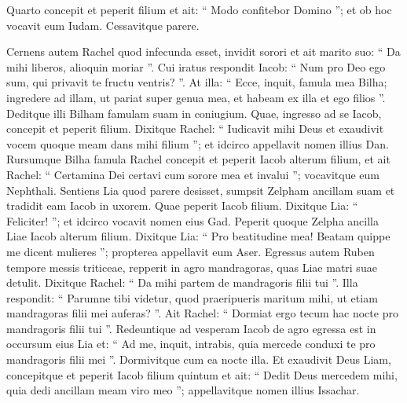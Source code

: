 \begin{biblechapter}
\begin{biblechapter}
\begin{biblechapter}
\begin{biblechapter}
\begin{biblechapter}
\begin{biblechapter}
\begin{biblechapter}
\begin{biblechapter}
\begin{biblechapter}
\begin{biblechapter}
\begin{biblechapter}
\begin{biblechapter}
\begin{biblechapter}
\begin{biblechapter}
\begin{biblechapter}
\begin{biblechapter}
\begin{biblechapter}
\begin{biblechapter}
\begin{biblechapter}
\begin{biblechapter}
\begin{biblechapter}
\begin{biblechapter}
\begin{biblechapter}
\begin{biblechapter}
\begin{biblechapter}
\begin{biblechapter}
\begin{biblechapter}
\begin{biblechapter}
\begin{biblechapter}
 \verse Quarto concepit et peperit filium et ait: “ Modo confitebor Domino ”; et ob hoc vocavit eum Iudam. Cessavitque parere.
 
\begin{biblechapter}
\verse Cernens autem Rachel quod infecunda esset, invidit sorori et ait marito suo: “ Da mihi liberos, alioquin moriar ”. 
\verse Cui iratus respondit Iacob: “ Num pro Deo ego sum, qui privavit te fructu ventris? ”. 
\verse At illa: “ Ecce, inquit, famula mea Bilha; ingredere ad illam, ut pariat super genua mea, et habeam ex illa et ego filios ”. 
\verse Deditque illi Bilham famulam suam in coniugium. Quae, 
\verse ingresso ad se Iacob, concepit et peperit filium. 
\verse Dixitque Rachel: “ Iudicavit mihi Deus et exaudivit vocem quoque meam dans mihi filium ”; et idcirco appellavit nomen illius Dan.
 \verse Rursumque Bilha famula Rachel concepit et peperit Iacob alterum filium, et 
 \verse ait Rachel: “ Certamina Dei certavi cum sorore mea et invalui ”; vocavitque eum Nephthali.
 \verse Sentiens Lia quod parere desisset, sumpsit Zelpham ancillam suam et tradidit eam Iacob in uxorem. 
\verse Quae peperit Iacob filium. 
\verse Dixitque Lia: “ Feliciter! ”; et idcirco vocavit nomen eius Gad.
 \verse Peperit quoque Zelpha ancilla Liae Iacob alterum filium. 
\verse Dixitque Lia: “ Pro beatitudine mea! Beatam quippe me dicent mulieres ”; propterea appellavit eum Aser.
 \verse Egressus autem Ruben tempore messis triticeae, repperit in agro mandragoras, quas Liae matri suae detulit. Dixitque Rachel: “ Da mihi partem de mandragoris filii tui ”. 
\verse Illa respondit: “ Parumne tibi videtur, quod praeripueris maritum mihi, ut etiam mandragoras filii mei auferas? ”. Ait Rachel: “ Dormiat ergo tecum hac nocte pro mandragoris filii tui ”. 
\verse Redeuntique ad vesperam Iacob de agro egressa est in occursum eius Lia et: “ Ad me, inquit, intrabis, quia mercede conduxi te pro mandragoris filii mei ”. Dormivitque cum ea nocte illa. 
\verse Et exaudivit Deus Liam, concepitque et peperit Iacob filium quintum 
 \verse et ait: “ Dedit Deus mercedem mihi, quia dedi ancillam meam viro meo ”; appellavitque nomen illius Issachar.

\end{biblechapter}
\end{biblechapter}
\end{biblechapter}
\end{biblechapter}
\end{biblechapter}
\end{biblechapter}
\end{biblechapter}
\end{biblechapter}
\end{biblechapter}
\end{biblechapter}
\end{biblechapter}
\end{biblechapter}
\end{biblechapter}
\end{biblechapter}
\end{biblechapter}
\end{biblechapter}
\end{biblechapter}
\end{biblechapter}
\end{biblechapter}
\end{biblechapter}
\end{biblechapter}
\end{biblechapter}
\end{biblechapter}
\end{biblechapter}
\end{biblechapter}
\end{biblechapter}
\end{biblechapter}
\end{biblechapter}
\end{biblechapter}
\end{biblechapter}
